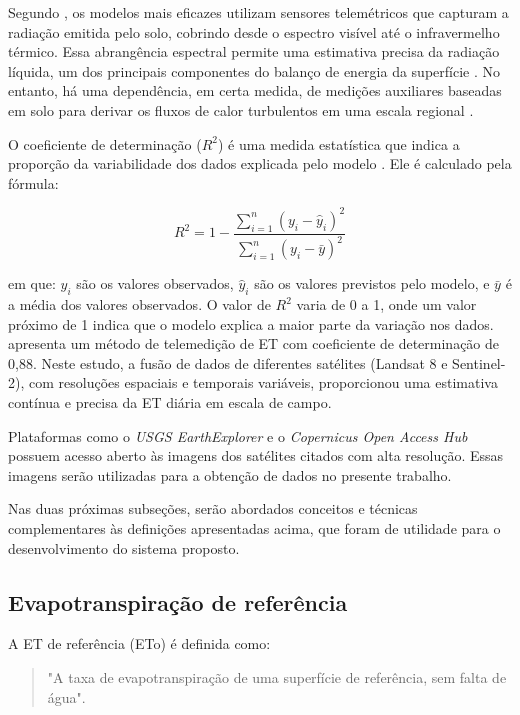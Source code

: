 Segundo \textcite{Zhao_evapotranspiration_med2009}, os modelos mais eficazes utilizam sensores telemétricos que capturam a radiação emitida pelo solo, cobrindo desde o espectro visível até o infravermelho térmico. Essa abrangência espectral permite uma estimativa precisa da radiação líquida, um dos principais componentes do balanço de energia da superfície \parencite{Zhao_evapotranspiration_med2009}. No entanto, há uma dependência, em certa medida, de medições auxiliares baseadas em solo para derivar os fluxos de calor turbulentos em uma escala regional \parencite{Zhang_evapotranspiration_med2016}.

O coeficiente de determinação (\(R^2\)) é uma medida estatística que indica a proporção da variabilidade dos dados explicada pelo modelo \parencite{mood1974}. Ele é calculado pela fórmula:

\[
R^2 = 1 - \frac{\sum_{i=1}^n (y_i - \hat{y}_i)^2}{\sum_{i=1}^n (y_i - \bar{y})^2}
\]

\noindent em que: \(y_i\) são os valores observados, \(\hat{y}_i\) são os valores previstos pelo modelo, e \(\bar{y}\) é a média dos valores observados. O valor de \(R^2\) varia de 0 a 1, onde um valor próximo de 1 indica que o modelo explica a maior parte da variação nos dados. \textcite{Yang_evapotranspiration_med2022} apresenta um método de telemedição de ET com coeficiente de determinação de 0,88. Neste estudo, a fusão de dados de diferentes satélites (Landsat 8 e Sentinel-2), com resoluções espaciais e temporais variáveis, proporcionou uma estimativa contínua e precisa da ET diária em escala de campo.


Plataformas como o \textit{USGS EarthExplorer} e o \textit{Copernicus Open Access Hub} possuem acesso aberto às imagens dos satélites citados com alta resolução. Essas imagens serão utilizadas para a obtenção de dados no presente trabalho.

Nas duas próximas subseções, serão abordados conceitos e técnicas complementares às definições apresentadas acima, que foram de utilidade para o desenvolvimento do sistema proposto.

\subsection{Evapotranspiração de referência}

A ET de referência (ETo) é definida como:

\begin{quote}
  "A taxa de evapotranspiração de uma superfície de referência, sem falta de água". \parencite[{p. 7}]{Allen_evapotranspiration1998}
\end{quote}

